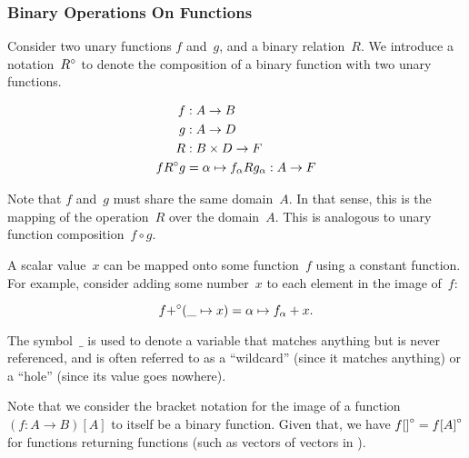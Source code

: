 \subsubsection{Binary Operations On Functions}
Consider two unary functions $f$ and~$g$,
  and a binary relation~$R$.
We introduce a notation~${R}^\circ$ to denote the composition of a binary
  function with two unary functions.

\begin{align}
  f &: A \rightarrow B \\
  g &: A \rightarrow D \\
  R &: B\times D \rightarrow F \\
  f {R}^\circ g &= \alpha \mapsto f_\alpha R g_\alpha : A \rightarrow F
\end{align}

\indexsym{}
Note that $f$ and~$g$ must share the same domain~$A$.
In that sense,
  this is the mapping of the operation~$R$ over the domain~$A$.
This is analogous to unary function composition~$f\circ g$.

A scalar value~$x$ can be mapped onto some function~$f$ using a constant
  function.
For example,
  consider adding some number~$x$ to each element in the image of~$f$:

\begin{equation*}
  f {+}^\circ (\_\mapsto x) = \alpha \mapsto f_\alpha + x.
\end{equation*}

The symbol~$\_$ is used to denote a variable that matches anything but is
  never referenced,
    and is often referred to as a ``wildcard'' (since it matches anything)
    or a ``hole'' (since its value goes nowhere).

Note that we consider the bracket notation for the image of a function
  $(f:A\rightarrow B)[A]$ to itself be a binary function.
Given that, we have $f{[]}^\circ = f{[A]}^\circ$ for functions returning
  functions (such as vectors of vectors in ).


